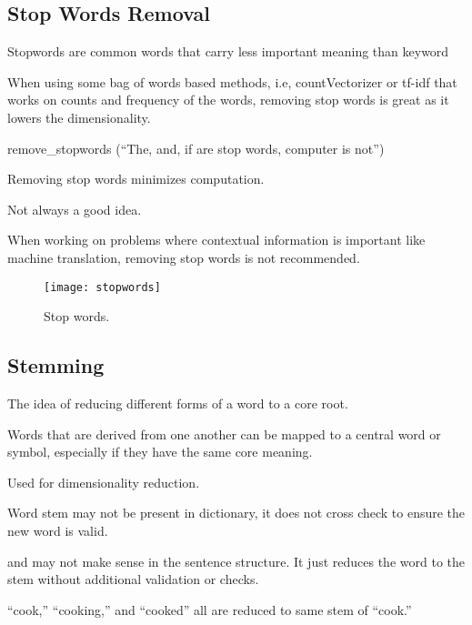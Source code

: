 	\subsection{Stop Words Removal}
	\begin{bulletedlist}
		\item Stopwords are common words that carry less important meaning than keyword
		\item When using some bag of words based methods, i.e, countVectorizer or tf-idf that works on counts and frequency of the words, removing stop words is great as it lowers the dimensionality.
		\begin{bulletedlist}
			\item remove\_stopwords (``The, and, if are stop words, computer is not'')
			\item Removing stop words minimizes computation.
		\end{bulletedlist}
		\item Not always a good idea.
		\begin{bulletedlist}
			\item When working on problems where contextual information is important like machine translation, removing stop words is not
recommended.
		\end{bulletedlist}
	\end{bulletedlist}

	\begin{figure}[h]
		\centering
		\texttt{[image: stopwords]}
		\caption[Stop words]{Stop words.}
		\label{fig:stopwords}
	\end{figure}


	\subsection{Stemming}
	\begin{bulletedlist}
		\item The idea of reducing different forms of a word to a core root.
		\item Words that are derived from one another can be mapped to a central word or symbol, especially if they have the same
core meaning.
		\item Used for dimensionality reduction.
		\item Word stem may not be present in dictionary, it does not cross check to ensure the new word is valid.
		\item and may not make sense in the sentence structure.  It just reduces the word to the stem without additional validation or checks.
		\item ``cook,'' ``cooking,'' and ``cooked'' all are reduced to same stem of ``cook.''
	\end{bulletedlist}

